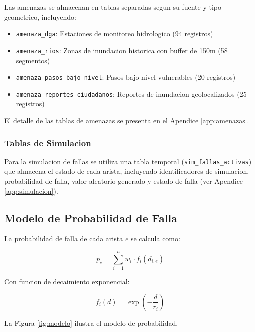 \documentclass[conference]{IEEEtran}
\begin{document}
Las amenazas se almacenan en tablas separadas segun su fuente y tipo geometrico, incluyendo:

\begin{itemize}
    \item \texttt{amenaza\_dga}: Estaciones de monitoreo hidrologico (94 registros)
    \item \texttt{amenaza\_rios}: Zonas de inundacion historica con buffer de 150m (58 segmentos)
    \item \texttt{amenaza\_pasos\_bajo\_nivel}: Pasos bajo nivel vulnerables (20 registros)
    \item \texttt{amenaza\_reportes\_ciudadanos}: Reportes de inundacion geolocalizados (25 registros)
\end{itemize}

El detalle de las tablas de amenazas se presenta en el Apendice \ref{app:amenazas}.

\subsubsection{Tablas de Simulacion}

Para la simulacion de fallas se utiliza una tabla temporal (\texttt{sim\_fallas\_activas}) que almacena el estado de cada arista, incluyendo identificadores de simulacion, probabilidad de falla, valor aleatorio generado y estado de falla (ver Apendice \ref{app:simulacion}).

\subsection{Modelo de Probabilidad de Falla}

La probabilidad de falla de cada arista $e$ se calcula como:

\begin{equation}
p_e = \sum_{i=1}^{n} w_i \cdot f_i(d_{i,e})
\end{equation}

Con funcion de decaimiento exponencial:

\begin{equation}
f_i(d) = \exp\left(-\frac{d}{r_i}\right)
\end{equation}

La Figura \ref{fig:modelo} ilustra el modelo de probabilidad.
\end{document}
